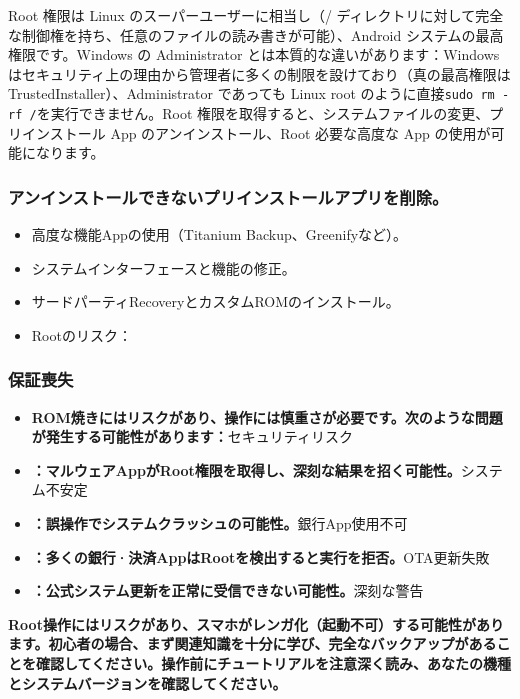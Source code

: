 
Root 権限は Linux のスーパーユーザーに相当し（/ ディレクトリに対して完全な制御権を持ち、任意のファイルの読み書きが可能）、Android システムの最高権限です。Windows の Administrator とは本質的な違いがあります：Windows はセキュリティ上の理由から管理者に多くの制限を設けており（真の最高権限は TrustedInstaller）、Administrator であっても Linux root のように直接\texttt{sudo rm -\allowbreak rf /\allowbreak *}を実行できません。Root 権限を取得すると、システムファイルの変更、プリインストール App のアンインストール、Root 必要な高度な App の使用が可能になります。

\subsubsection*{アンインストールできないプリインストールアプリを削除。}

\begin{itemize}
  \item 高度な機能Appの使用（Titanium Backup、Greenifyなど）。
  \item システムインターフェースと機能の修正。
  \item サードパーティRecoveryとカスタムROMのインストール。
  \item Rootのリスク：
\end{itemize}

\subsubsection*{保証喪失}

\begin{itemize}
  \item \textbf{ROM焼きにはリスクがあり、操作には慎重さが必要です。次のような問題が発生する可能性があります：}セキュリティリスク
  \item \textbf{：マルウェアAppがRoot権限を取得し、深刻な結果を招く可能性。}システム不安定
  \item \textbf{：誤操作でシステムクラッシュの可能性。}銀行App使用不可
  \item \textbf{：多くの銀行·決済AppはRootを検出すると実行を拒否。}OTA更新失敗
  \item \textbf{：公式システム更新を正常に受信できない可能性。}深刻な警告
\end{itemize}

\textbf{Root操作にはリスクがあり、スマホがレンガ化（起動不可）する可能性があります。初心者の場合、まず関連知識を十分に学び、完全なバックアップがあることを確認してください。操作前にチュートリアルを注意深く読み、あなたの機種とシステムバージョンを確認してください。}\par

